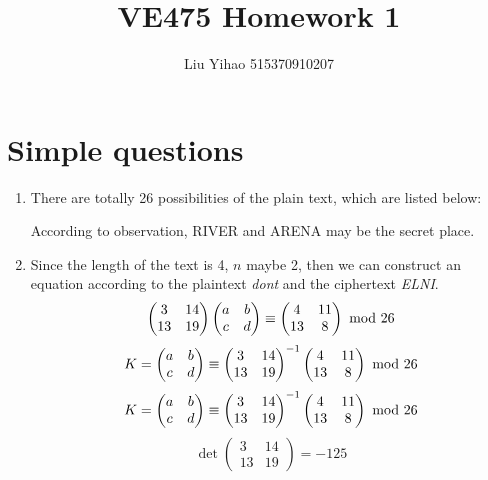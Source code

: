 \documentclass{article}
\title{VE475 Homework 1}
\author{Liu Yihao 515370910207}
\date{}
\begin{document}
\maketitle

\section{Simple questions}
\begin{enumerate}
\item
There are totally 26 possibilities of the plain text, which are listed below:



According to observation, RIVER and ARENA may be the secret place.

\item
Since the length of the text is 4, $n$ maybe 2, then we can construct an equation according to the plaintext \emph{dont} and the ciphertext \emph{ELNI}.
$$
\begin{pmatrix}3&14\\13&19\end{pmatrix}
\begin{pmatrix}a&b\\c&d\end{pmatrix}
\equiv\begin{pmatrix}4&11\\13&8\end{pmatrix}
{\rm\ mod\ }26
$$
$$
K=\begin{pmatrix}a&b\\c&d\end{pmatrix}\equiv
\begin{pmatrix}3&14\\13&19\end{pmatrix}^{-1}
\begin{pmatrix}4&11\\13&8\end{pmatrix}
{\rm\ mod\ }26
$$
$$
K=\begin{pmatrix}a&b\\c&d\end{pmatrix}\equiv
\begin{pmatrix}3&14\\13&19\end{pmatrix}^{-1}
\begin{pmatrix}4&11\\13&8\end{pmatrix}
{\rm\ mod\ }26
$$
$$\det\begin{pmatrix}3&14\\13&19\end{pmatrix}=-125$$

\end{enumerate}
\end{document}
